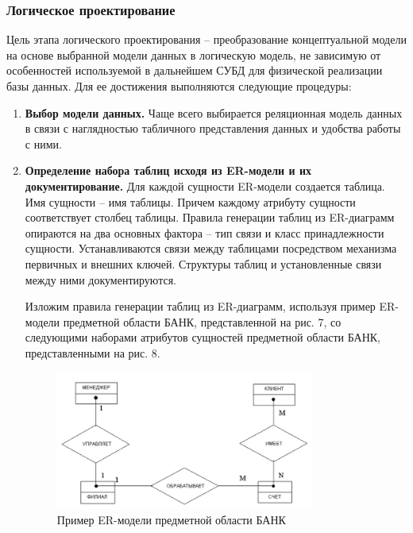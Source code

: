 \subsubsection{Логическое  проектирование}

Цель этапа логического проектирования – преобразование концептуальной модели на основе выбранной модели данных
в логическую модель, не зависимую от особенностей используемой в дальнейшем СУБД для физической реализации базы
данных. Для ее достижения выполняются следующие процедуры:
\begin{enumerate}
    \item \textbf{Выбор модели данных.}
        Чаще всего выбирается реляционная модель данных в связи с наглядностью табличного представления данных
        и удобства работы с ними.

    \item \textbf{Определение набора таблиц исходя из ER-модели и их документирование.}
        Для каждой сущности ER-модели создается таблица. Имя сущности – имя таблицы. Причем каждому атрибуту
        сущности соответствует столбец таблицы. Правила генерации таблиц из ER-диаграмм опираются на два основных
        фактора – тип связи и класс принадлежности сущности. Устанавливаются связи между таблицами посредством
        механизма первичных и внешних ключей. Структуры таблиц и установленные связи между ними документируются.

        Изложим правила генерации таблиц из ER-диаграмм, используя пример ER-модели предметной
        области БАНК, представленной на рис. 7, со следующими наборами атрибутов сущностей предметной области БАНК,
        представленными на рис. 8.

    \begin{figure}[H]
        \centering
        \includegraphics[width=0.8\textwidth]{assets/security/pic2.png}
        \caption{Пример ER-модели предметной области БАНК}
        \label{fig:mesh04}
    \end{figure}


\end{enumerate}
